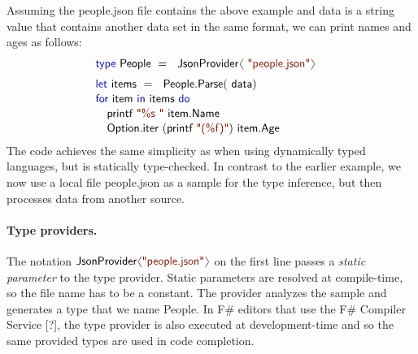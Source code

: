 \documentclass[preprint]{sigplanconf}
\newcommand{\langl}{\begin{picture}(4.5,7)
\put(1.1,2.5){\rotatebox{60}{\line(1,0){5.5}}}
\put(1.1,2.5){\rotatebox{300}{\line(1,0){5.5}}}
\end{picture}}
\newcommand{\rangl}{\begin{picture}(4.5,7)
\put(.9,2.5){\rotatebox{120}{\line(1,0){5.5}}}
\put(.9,2.5){\rotatebox{240}{\line(1,0){5.5}}}
\end{picture}}
\newcommand{\kvd}[1]{\textnormal{\textcolor{kvdclr}{\sffamily #1}}}
\newcommand{\str}[1]{\textnormal{\textcolor{strclr}{\sffamily "#1"}}}
\newcommand{\strf}[1]{\textnormal{\textcolor{strclr}{\sffamily #1}}}
\newcommand{\ident}[1]{\textnormal{\sffamily #1}}
\begin{document}
Assuming the \strf{people.json} file contains the above example and \ident{data} is a string value
that contains another data set in the same format, we can print names and ages as follows:
%
\begin{equation*}
\begin{array}{l}
 \kvd{type}~\ident{People}~=~\ident{JsonProvider}\langl\str{people.json}\rangl\hspace{1em} \\[0.6em]
 \kvd{let}~\ident{items}~=~\ident{People.Parse}(\ident{data})\\[0.1em]
 \kvd{for}~\ident{item}~\kvd{in}~\ident{items}~\kvd{do}\\[0.1em]
 \quad\ident{printf}~\str{\%s }~\ident{item.Name}\\[0.1em]
 \quad\ident{Option.iter}~(\ident{printf}~\str{(\%f)})~\ident{item.Age}
\end{array}
\end{equation*}
%
The code achieves the same simplicity as when using dynamically typed languages, but is statically 
type-checked. In contrast to the earlier example, we now use a local file \strf{people.json} as a 
sample for the type inference, but then processes data from another source. 

\paragraph{Type providers.}
The notation $\ident{JsonProvider}\langl\str{people.json}\rangl$ on the first line passes a 
\emph{static parameter} to the type provider. Static parameters are resolved at compile-time, 
so the file name has to be a constant. The provider analyzes the sample and generates
a type that we name \ident{People}. In F\# editors that use the F\# Compiler Service [?], the 
type provider is also executed at development-time and so the same provided types are
used in code completion.
\end{document}
